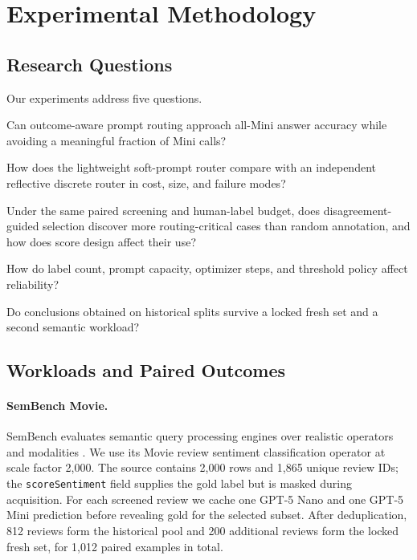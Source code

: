 \section{Experimental Methodology}
\label{sec:experiments}

\subsection{Research Questions}

Our experiments address five questions.

\begin{description}[leftmargin=0.9cm,style=nextline]
  \item[RQ1.] Can outcome-aware prompt routing approach all-Mini answer
  accuracy while avoiding a meaningful fraction of Mini calls?
  \item[RQ2.] How does the lightweight soft-prompt router compare with an
  independent reflective discrete router in cost, size, and failure modes?
  \item[RQ3.] Under the same paired screening and human-label budget,
  does disagreement-guided selection discover more routing-critical cases than
  random annotation, and how does score design affect their use?
  \item[RQ4.] How do label count, prompt capacity, optimizer steps, and
  threshold policy affect reliability?
  \item[RQ5.] Do conclusions obtained on historical splits survive a locked
  fresh set and a second semantic workload?
\end{description}

\subsection{Workloads and Paired Outcomes}

\paragraph{SemBench Movie.}
SemBench evaluates semantic query processing engines over realistic operators
and modalities \cite{lao2026sembench}. We use its Movie review sentiment
classification operator at scale factor 2,000. The source contains 2,000 rows
and 1,865 unique review IDs; the \texttt{scoreSentiment} field supplies the
gold label but is masked during acquisition. For each screened review we cache
one GPT-5 Nano and one GPT-5 Mini prediction before revealing gold for the
selected subset. After deduplication, 812 reviews form the historical
pool and 200 additional reviews form the locked fresh set, for 1,012 paired
examples in total.

